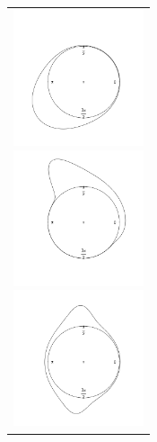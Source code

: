 \documentclass[a4j,11pt]{jarticle}
\begin{document}
\vspace{-0.5zh}
\begin{figure}[h]
 \begin{tabular}{c}
\hspace{0.5cm}
 \begin{minipage}{0.33\hsize}
  \begin{center}
   \includegraphics[clip,height= 40mm]{data/sample_symmetry.png}
  \end{center}
 \end{minipage}
\hspace{-1.0cm}
 \begin{minipage}{0.33\hsize}
  \begin{center}
 \includegraphics[clip,height= 40mm]{data/sample_asymmetry.png}
  \end{center}
 \end{minipage}
\hspace{-1.0cm}
 \begin{minipage}{0.33\hsize}
  \begin{center}
   \includegraphics[clip,height= 40mm]{data/sample_bimodal.png}
  \end{center}
 \end{minipage}
  \end{tabular}
\caption[Text excluding the matrix]{
}
\end{figure}
\end{document}
